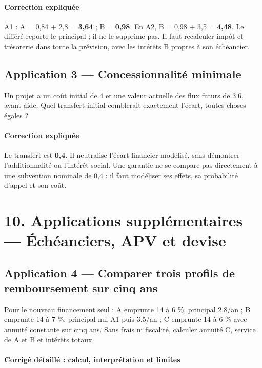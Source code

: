 \documentclass[12pt,a4paper]{article}
\begin{document}
\paragraph{Correction expliquée}
A1 : A = 0,84 + 2,8 = \textbf{3,64} ; B = \textbf{0,98}. En A2, B = 0,98 + 3,5 = \textbf{4,48}. Le différé reporte le principal ; il ne le supprime pas. Il faut recalculer impôt et trésorerie dans toute la prévision, avec les intérêts B propres à son échéancier.



\subsection*{Application 3 --- Concessionnalité minimale}
Un projet a un coût initial de 4 et une valeur actuelle des flux futurs de 3,6, avant aide. Quel transfert initial comblerait exactement l’écart, toutes choses égales ?


\paragraph{Correction expliquée}
Le transfert est \textbf{0,4}. Il neutralise l’écart financier modélisé, sans démontrer l’additionnalité ou l’intérêt social. Une garantie ne se compare pas directement à une subvention nominale de 0,4 : il faut modéliser ses effets, sa probabilité d’appel et son coût.

\section*{10. Applications supplémentaires --- Échéanciers, APV et devise}

\subsection*{Application 4 --- Comparer trois profils de remboursement sur cinq ans}
Pour le nouveau financement seul : A emprunte 14 à 6 \%, principal 2,8/an ; B emprunte 14 à 7 \%, principal nul A1 puis 3,5/an ; C emprunte 14 à 6 \% avec annuité constante sur cinq ans. Sans frais ni fiscalité, calculer annuité C, service de A et B et intérêts totaux.


\paragraph{Corrigé détaillé : calcul, interprétation et limites}
\end{document}
